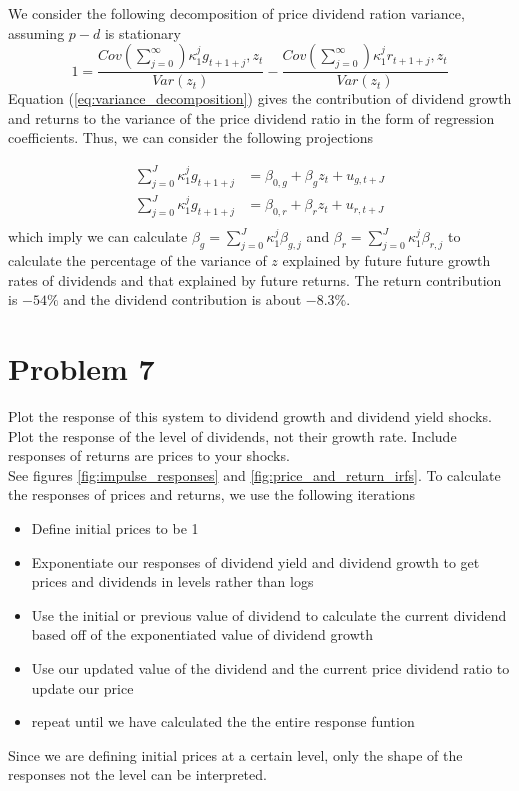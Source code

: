 \documentclass[11pt,letter]{article}
\begin{document}
We consider the following decomposition of price dividend ration variance, assuming $p-d$ is stationary
\begin{equation}
	1 = \frac{Cov(\sum_{j=0}^{\infty})\kappa_1^jg_{t+1+j}, z_t}{Var(z_t)} - \frac{Cov(\sum_{j=0}^{\infty})\kappa_1^jr_{t+1+j}, z_t}{Var(z_t)}
	\label{eq:variance_decomposition}
\end{equation} 
Equation (\ref{eq:variance_decomposition}) gives the contribution of dividend growth and returns to the variance of the price dividend ratio in the form of regression coefficients. Thus, we can consider the following projections

\begin{equation*}
\begin{split}
	\sum_{j=0}^{J} \kappa_1^j g_{t+1+j} &= \beta_{0, g} + \beta_g z_t +u_{g, t+J}\\
	\sum_{j=0}^{J} \kappa_1^j g_{t+1+j} &= \beta_{0, r} + \beta_r z_t +u_{r, t+J}\\
\end{split}
\end{equation*}
which imply we can calculate $\beta_g = \sum_{j=0}^{J}\kappa_1^j\beta_{g, j}$ and $\beta_r = \sum_{j=0}^{J}\kappa_1^j \beta_{r, j}$ to calculate the percentage of the variance of $z$ explained by future future growth rates of dividends and that explained by future returns. The return contribution is $-54\%$ and the dividend contribution is about $-8.3 \%$.

\section*{Problem 7}
Plot the response of this system to dividend growth and dividend yield shocks. Plot the response of the level of dividends, not their growth rate. Include responses of returns are prices to your shocks. \\

See figures \ref{fig:impulse_responses} and \ref{fig:price_and_return_irfs}. To calculate the responses of prices and returns, we use the following iterations
\begin{itemize}
	\item Define initial prices to be 1
	\item Exponentiate our responses of dividend yield and dividend growth to get prices and dividends in levels rather than logs
	\item Use the initial or previous value of dividend to calculate the current dividend based off of the exponentiated value of dividend growth
	\item Use our updated value of the dividend and the current price dividend ratio to update our price
	\item repeat until we have calculated the the entire response funtion
\end{itemize}
Since we are defining initial prices at a certain level, only the shape of the responses not the level can be interpreted. 
 
\end{document}
